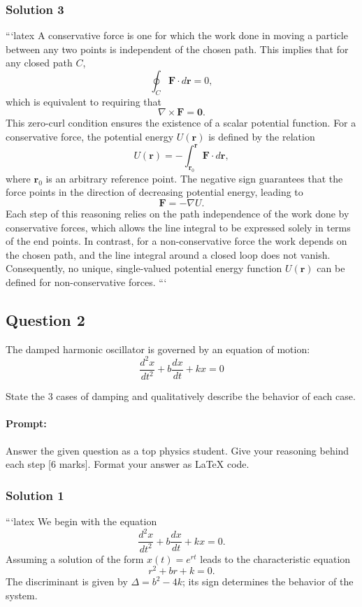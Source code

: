 \documentclass{article}
\begin{document}
\subsubsection{Solution 3}
```latex
A conservative force is one for which the work done in moving a particle between any two points is independent of the chosen path. This implies that for any closed path \( C \),
\[
\oint_C \mathbf{F}\cdot d\mathbf{r} = 0,
\]
which is equivalent to requiring that
\[
\nabla \times \mathbf{F} = \mathbf{0}.
\]
This zero-curl condition ensures the existence of a scalar potential function. For a conservative force, the potential energy \( U(\mathbf{r}) \) is defined by the relation
\[
U(\mathbf{r}) = -\int_{\mathbf{r}_0}^{\mathbf{r}} \mathbf{F}\cdot d\mathbf{r},
\]
where \(\mathbf{r}_0\) is an arbitrary reference point. The negative sign guarantees that the force points in the direction of decreasing potential energy, leading to
\[
\mathbf{F} = -\nabla U.
\]
Each step of this reasoning relies on the path independence of the work done by conservative forces, which allows the line integral to be expressed solely in terms of the end points. In contrast, for a non-conservative force the work depends on the chosen path, and the line integral around a closed loop does not vanish. Consequently, no unique, single-valued potential energy function \( U(\mathbf{r}) \) can be defined for non-conservative forces.
```

\subsection{Question 2}
The damped harmonic oscillator is governed by an equation of motion:
\[
\frac{d^2x}{dt^2} + b\frac{dx}{dt} + kx = 0
\]

State the 3 cases of damping and qualitatively describe the behavior of each case.

\paragraph{Prompt: \\} 
Answer the given question as a top physics student. Give your reasoning behind each step [6 marks].
Format your answer as LaTeX code. 

\subsubsection{Solution 1}
```latex
We begin with the equation
\[
\frac{d^2x}{dt^2} + b\frac{dx}{dt} + kx = 0.
\]
Assuming a solution of the form \(x(t) = e^{rt}\) leads to the characteristic equation
\[
r^2 + br + k = 0.
\]
The discriminant is given by \(\Delta = b^2 - 4k\); its sign determines the behavior of the system.
\end{document}
